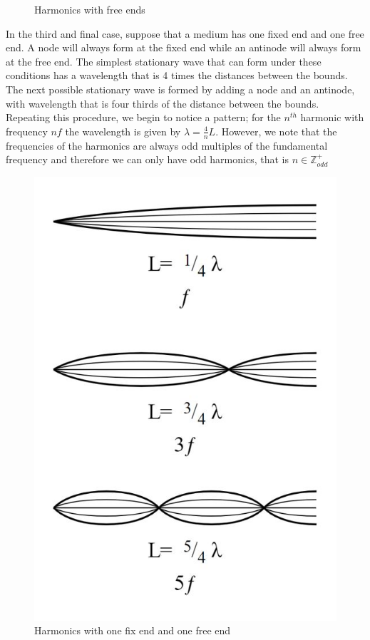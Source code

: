 \begin{figure}[h!]
    \caption{Harmonics with free ends}
\end{figure}
\FloatBarrier

In the third and final case, suppose that a medium has one fixed end and one free end. A node will always form at the fixed end while an antinode will always form at the free end. The simplest stationary wave that can form under these conditions has a wavelength that is 4 times the distances between the bounds. The next possible stationary wave is formed by adding a node and an antinode, with wavelength that is four thirds of the distance between the bounds. Repeating this procedure, we begin to notice a pattern; for the $n^{th}$ harmonic with frequency $nf$ the wavelength is given by $\lambda = \frac{4}{n} L$. However, we note that the frequencies of the harmonics are always odd multiples of the fundamental frequency and therefore we can only have odd harmonics, that is $n \in \mathbb{Z}_{odd}^+$

\begin{figure}[h!]
    \centering
    \includegraphics[scale=0.55]{notes/images/Harmonic-3.JPG}
    \caption{Harmonics with one fix end and one free end}
\end{figure}
\FloatBarrier

